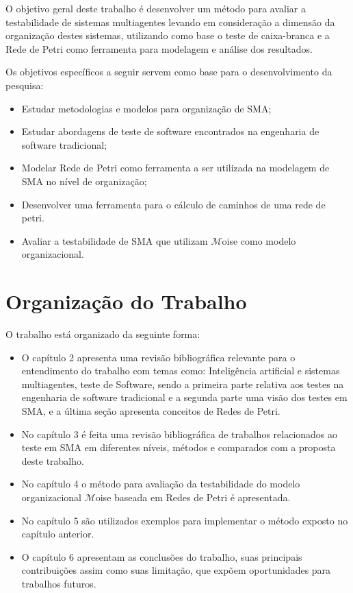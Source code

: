 O objetivo geral deste trabalho é desenvolver um método para avaliar a testabilidade de sistemas multiagentes levando em consideração a dimensão da organização destes sistemas, utilizando como base o teste de caixa-branca e a Rede de Petri como ferramenta para modelagem e análise dos resultados.

Os objetivos específicos a seguir servem como base para o desenvolvimento da pesquisa:

\begin{itemize}

\item Estudar metodologias e modelos para organização de SMA;
\item Estudar abordagens de teste de software encontrados na engenharia de software tradicional;
\item Modelar Rede de Petri como ferramenta a ser utilizada na modelagem de SMA no nível de organização;
\item Desenvolver uma ferramenta para o cálculo de caminhos de uma rede de petri.
\item Avaliar a testabilidade de SMA que utilizam $\mathcal{M}$oise como modelo organizacional.
\end{itemize}


\section{Organização do Trabalho}

O trabalho está organizado da seguinte forma:

\begin{itemize}
\item O capítulo 2 apresenta uma revisão bibliográfica relevante para o entendimento do trabalho com temas como: Inteligência artificial e sistemas multiagentes, teste de Software, sendo a primeira parte relativa aos testes na engenharia de software tradicional e a segunda parte uma visão dos testes em SMA, e a última seção apresenta conceitos de Redes de Petri.

\item No capítulo 3 é feita uma revisão bibliográfica de trabalhos relacionados ao teste em SMA em diferentes níveis, métodos e comparados com a proposta deste trabalho.

\item No capítulo 4 o método para avaliação da testabilidade do modelo organizacional $\mathcal{M}$oise baseada em Redes de Petri é apresentada.

\item No capítulo 5 são utilizados exemplos para implementar o método exposto no capítulo anterior.

\item O capítulo 6 apresentam as conclusões do trabalho, suas principais contribuições assim como suas limitação, que expõem oportunidades para trabalhos futuros.
\end{itemize}

